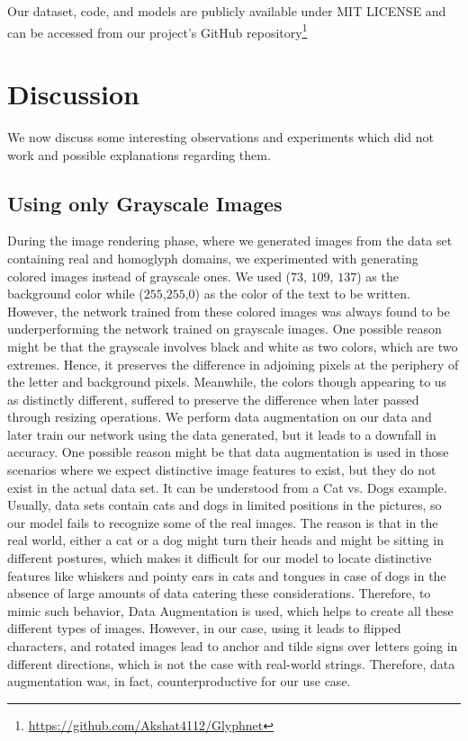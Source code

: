 \documentclass[letterpaper]{article} \usepackage{aaai22}  \usepackage{times}  \usepackage{helvet}  \usepackage{courier}  \usepackage[hyphens]{url}  \usepackage{graphicx} \urlstyle{rm} \def\UrlFont{\rm}  \usepackage{natbib}  \usepackage{caption} \DeclareCaptionStyle{ruled}{labelfont=normalfont,labelsep=colon,strut=off} \frenchspacing  \setlength{\pdfpagewidth}{8.5in}  \setlength{\pdfpageheight}{11in}  \usepackage{algorithm}
\begin{document}
Our dataset, code, and models are publicly available under MIT LICENSE and can be accessed from our project's GitHub repository\footnote{\url{https://github.com/Akshat4112/Glyphnet}}

\section{Discussion}
We now discuss some interesting observations and experiments which did not work and possible explanations regarding them.

\subsection{Using only Grayscale Images}
During the image rendering phase, where we generated images from the data set containing real and homoglyph domains, we experimented with generating colored images instead of grayscale ones. We used ($73$, $109$, $137$) as the background color while ($255$,$255$,$0$) as the color of the text to be written. However, the network trained from these colored images was always found to be underperforming the network trained on grayscale images. One possible reason might be that the grayscale involves black and white as two colors, which are two extremes. Hence, it preserves the difference in adjoining pixels at the periphery of the letter and background pixels.
Meanwhile, the colors though appearing to us as distinctly different, suffered to preserve the difference when later passed through resizing operations. We perform data augmentation on our data and later train our network using the data generated, but it leads to a downfall in accuracy. One possible reason might be that data augmentation\cite{shorten2019survey} is used in those scenarios where we expect distinctive image features to exist, but they do not exist in the actual data set. It can be understood from a Cat vs. Dogs example. Usually, data sets contain cats and dogs in limited positions in the pictures, so our model fails to recognize some of the real images. The reason is that in the real world, either a cat or a dog might turn their heads and might be sitting in different postures, which makes it difficult for our model to locate distinctive features like whiskers and pointy ears in cats and tongues in case of dogs in the absence of large amounts of data catering these considerations. Therefore, to mimic such behavior, Data Augmentation is used, which helps to create all these different types of images. However, in our case, using it leads to flipped characters, and rotated images lead to anchor and tilde signs over letters going in different directions, which is not the case with real-world strings. Therefore, data augmentation was, in fact, counterproductive for our use case.
\end{document}
